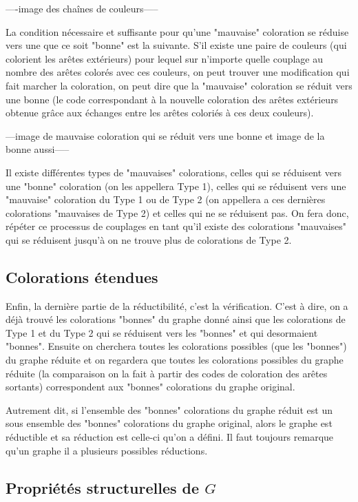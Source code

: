 \documentclass[10pt,a4paper]{article}
\begin{document}
----image des chaînes de couleurs-----

La condition nécessaire et suffisante pour qu'une "mauvaise" coloration se réduise vers une que ce soit "bonne" est la suivante. S'il existe une paire de couleurs (qui colorient les arêtes extérieurs) pour lequel sur n'importe quelle couplage au nombre des arêtes colorés avec ces couleurs, on peut trouver une modification qui fait marcher la coloration, on peut dire que la "mauvaise" coloration se réduit vers une bonne (le code correspondant à la nouvelle coloration des arêtes extérieurs obtenue grâce aux échanges entre les arêtes coloriés à ces deux couleurs).

---image de mauvaise coloration qui se réduit vers une bonne et image de la bonne aussi-----

Il existe différentes types de "mauvaises" colorations, celles qui se réduisent vers une "bonne" coloration (on les appellera Type 1), celles qui se réduisent vers une "mauvaise" coloration du Type 1 ou de Type 2 (on appellera a ces dernières colorations "mauvaises de Type 2) et celles qui ne se réduisent pas. On fera donc, répéter ce processus de couplages en tant qu'il existe des colorations "mauvaises" qui se réduisent jusqu'à on ne trouve plus de colorations de Type 2.

\subsection{Colorations étendues}

Enfin, la dernière partie de la réductibilité, c'est la vérification. C'est à dire, on a déjà trouvé les colorations "bonnes" du graphe donné ainsi que les colorations de Type 1 et du Type 2 qui se réduisent vers les "bonnes" et qui desormaient "bonnes". Ensuite on cherchera toutes les colorations possibles (que les "bonnes") du graphe réduite et on regardera que toutes les colorations possibles du graphe réduite (la comparaison on la fait à partir des codes de coloration des arêtes sortants) correspondent aux "bonnes" colorations du graphe original. 

Autrement dit, si l'ensemble des "bonnes" colorations du graphe réduit est un sous ensemble des "bonnes" colorations du graphe original, alors le graphe est réductible et sa réduction est celle-ci qu'on a défini. Il faut toujours remarque qu'un graphe il a plusieurs possibles réductions. 
\subsection{Propriétés structurelles de $G$}
\end{document}
